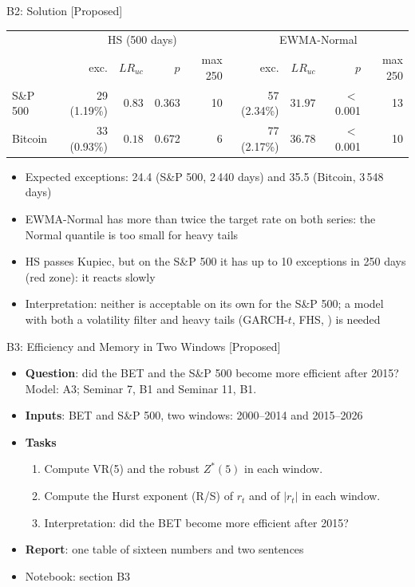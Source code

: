 \ifsolutions
\begin{frame}{B2: Solution [Proposed]}
\itemsize{\footnotesize}
\begin{center}
\scriptsize
\begin{tabular}{l|rrrr|rrrr}
\toprule
& \multicolumn{4}{c|}{HS (500 days)} & \multicolumn{4}{c}{EWMA-Normal} \\ & exc. & $LR_{uc}$ & $p$ & max 250 & exc. & $LR_{uc}$ & $p$ & max 250 \\
\midrule
S\&P 500 & 29 (1.19\%) & ${0.83}$ & 0.363 & 10 & 57 (2.34\%) & ${31.97}$ & $<$\,0.001 & 13 \\
Bitcoin & 33 (0.93\%) & ${0.18}$ & 0.672 & 6 & 77 (2.17\%) & ${36.78}$ & $<$\,0.001 & 10 \\
\bottomrule
\end{tabular}
\end{center}
\begin{itemize}
    \item Expected exceptions: 24.4 (S\&P 500, 2\,440 days) and 35.5 (Bitcoin, 3\,548 days)
    \item EWMA-Normal has more than twice the target rate on both series: the Normal quantile is too small for heavy tails
    \item HS passes Kupiec, but on the S\&P 500 it has up to 10 exceptions in 250 days (red zone): it reacts slowly
    \item Interpretation: neither is acceptable on its own for the S\&P 500; a model with both a volatility filter and heavy tails (GARCH-$t$, FHS, ) is needed
\end{itemize}
\end{frame}
\fi

\begin{frame}{B3: Efficiency and Memory in Two Windows [Proposed]}
\itemsize{\footnotesize}
\begin{itemize}
\item \textbf{Question}: did the BET and the S\&P 500 become more efficient after 2015? Model: A3; Seminar 7, B1 and Seminar 11, B1.
\item \textbf{Inputs}: BET and S\&P 500, two windows: 2000--2014 and 2015--2026
\item \textbf{Tasks}
\begin{enumerate}
    \item Compute VR(5) and the robust $Z^*(5)$ in each window.
    \item Compute the Hurst exponent (R/S) of $r_t$ and of $|r_t|$ in each window.
    \item Interpretation: did the BET become more efficient after 2015?
\end{enumerate}
\item \textbf{Report}: one table of sixteen numbers and two sentences
\item Notebook: section B3
\end{itemize}
\end{frame}

